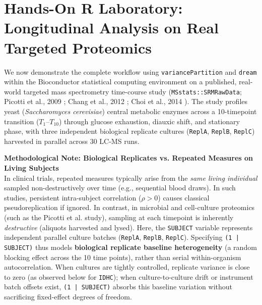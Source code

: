 \documentclass[11pt,twoside,openright]{book}
\begin{document}
\section{Hands-On R Laboratory: Longitudinal Analysis on Real Targeted Proteomics}

We now demonstrate the complete workflow using \texttt{variancePartition} and \texttt{dream} within the Bioconductor statistical computing environment \cite{gentleman2005bioinformatics, hoffman2021dream, goeminne2016msqrob2} on a published, real-world targeted mass spectrometry time-course study (\texttt{MSstats::SRMRawData}; Picotti et al., 2009 \cite{picotti2009high}; Chang et al., 2012 \cite{chang2012protein}; Choi et al., 2014 \cite{choi2014msstats}). The study profiles yeast (\textit{Saccharomyces cerevisiae}) central metabolic enzymes across a 10-timepoint transition ($T_1\text{--}T_{10}$) through glucose exhaustion, diauxic shift, and stationary phase, with three independent biological replicate cultures (\texttt{ReplA}, \texttt{ReplB}, \texttt{ReplC}) harvested in parallel across 30 LC-MS runs.

\begin{notebox}
\textbf{Methodological Note: Biological Replicates vs. Repeated Measures on Living Subjects}\\
In clinical trials, repeated measures typically arise from the \textit{same living individual} sampled non-destructively over time (e.g., sequential blood draws). In such studies, persistent intra-subject correlation ($\rho > 0$) causes classical pseudoreplication if ignored. 
In contrast, in microbial and cell-culture proteomics (such as the Picotti et al. study), sampling at each timepoint is inherently \textit{destructive} (aliquots harvested and lysed). Here, the \texttt{SUBJECT} variable represents independent parallel culture batches (\texttt{ReplA}, \texttt{ReplB}, \texttt{ReplC}). Specifying \texttt{(1 | SUBJECT)} thus models \textbf{biological replicate baseline heterogeneity} (a random blocking effect across the 10 time points), rather than serial within-organism autocorrelation. When cultures are tightly controlled, replicate variance is close to zero (as observed below for \texttt{IDHC}); when culture-to-culture drift or instrument batch offsets exist, \texttt{(1 | SUBJECT)} absorbs this baseline variation without sacrificing fixed-effect degrees of freedom.
\end{notebox}
\end{document}
